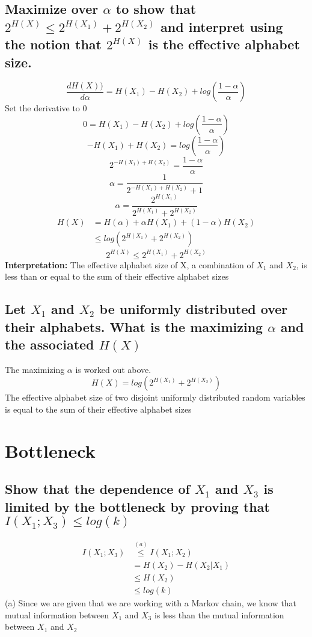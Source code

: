 \documentclass[11pt, oneside]{book}   	%
\begin{document}
\subsection{Maximize over $\alpha$ to show that $2^{H(X)} \leq 2^{H(X_1)}+2^{H(X_2)}$ and interpret using the notion that $2^{H(X)}$ is the effective alphabet size.}

$$\frac{dH(X))}{d\alpha} = H(X_1)-H(X_2)+log(\frac{1-\alpha}{\alpha})$$
Set the derivative to 0
$$0 = H(X_1)-H(X_2)+log(\frac{1-\alpha}{\alpha})$$
$$-H(X_1)+H(X_2) = log(\frac{1-\alpha}{\alpha})$$
$$2^{-H(X_1)+H(X_2)} = \frac{1-\alpha}{\alpha}$$
$$\alpha = \frac{1}{2^{-H(X_1)+H(X_2)} + 1}$$
$$\alpha = \frac{2^{H(X_1)}}{2^{H(X_1)} + 2^{H(X_2)}}$$
\begin{equation}
\begin{split}
H(X) & = H(\alpha) + \alpha H(X_1) + (1-\alpha)H(X_2)\\
& \leq log(2^{H(X_1)} + 2^{H(X_2)})
\end{split}
\end{equation}
$$2^{H(X)} \leq 2^{H(X_1)} + 2^{H(X_2)}$$
\textbf{Interpretation:} The effective alphabet size of X, a combination of $X_1$ and $X_2$, is less than or equal to the sum of their effective alphabet sizes
\subsection{Let $X_1$ and $X_2$ be uniformly distributed over their alphabets.  What is the maximizing $\alpha$ and the associated $H(X)$}
The maximizing $\alpha$ is worked out above.
$$H(X) = log(2^{H(X_1)} + 2^{H(X_2)})$$
The effective alphabet size of two disjoint uniformly distributed random variables is equal to the sum of their effective alphabet sizes

\section{Bottleneck}
\subsection{Show that the dependence of $X_1$ and $X_3$ is limited by the bottleneck by proving that $I(X_1;X_3) \leq log(k)$}

\begin{equation}
\begin{split}
I(X_1;X_3) & \overset{(a)}{\leq} I(X_1;X_2)\\
& = H(X_2) - H(X_2|X_1)\\
& \leq H(X_2)\\
& \leq log(k)
\end{split}
\end{equation}
(a) Since we are given that we are working with a Markov chain, we know that mutual information between $X_1$ and $X_3$ is less than the mutual information between $X_1$ and $X_2$
\end{document}
